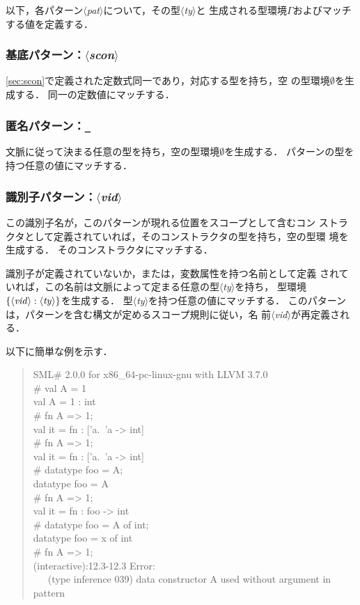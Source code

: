 \documentclass{jbook}
\newcommand{\nonterm}[1]{\mbox{$\langle$}{\it #1}\mbox{$\rangle$}}
\newcommand{\term}[1]{\mbox{{\tt #1}}}
\newcommand{\ass}{\Gamma}
\newenvironment{program}{\begin{quote}\begin{tt}}%
                        {\end{tt}\end{quote}}
\begin{document}
	以下，各パターン\nonterm{pat}について，その型\nonterm{ty}と
生成される型環境$\ass$およびマッチする値を定義する．

\subsubsection{基底パターン：\nonterm{scon}}

	\ref{sec:scon}で定義された定数式同一であり，対応する型を持ち，空
の型環境$\emptyset$を生成する．
	同一の定数値にマッチする．

\subsubsection{匿名パターン：\term{\_}}

	文脈に従って決まる任意の型を持ち，空の型環境$\emptyset$を生成する．
	パターンの型を持つ任意の値にマッチする．

\subsubsection{識別子パターン：\nonterm{vid}}

	この識別子名が，このパターンが現れる位置をスコープとして含むコン
ストラクタとして定義されていれば，そのコンストラクタの型を持ち，空の型環
境を生成する．
	そのコンストラクタにマッチする．

	識別子が定義されていないか，または，変数属性を持つ名前として定義
されていれば，この名前は文脈によって定まる任意の型\nonterm{ty}を持ち，
型環境$\{\nonterm{vid} : \nonterm{ty}\}$を生成する．
	型\nonterm{ty}を持つ任意の値にマッチする．
	このパターンは，パターンを含む構文が定めるスコープ規則に従い，名
前\nonterm{vid}が再定義される．
	
	以下に簡単な例を示す．
\begin{program}
SML\# 2.0.0 for x86\_64-pc-linux-gnu with LLVM 3.7.0
\\
\# val A = 1
\\
val A = 1 : int
\\
\# fn A => 1;
\\
val it = fn : ['a.~'a -> int]
\\
\# fn A => 1;
\\
val it = fn : ['a.~'a -> int]
\\
\# datatype foo = A;
\\
datatype foo = A
\\
\# fn A => 1;
\\
val it = fn : foo -> int
\\
\# datatype foo = A of int;
\\
datatype foo = x of int
\\
\# fn A => 1;
\\
(interactive):12.3-12.3 Error:
\\
\ \ \  (type inference 039) data constructor A used without argument in pattern
\end{program}	
\end{document}
